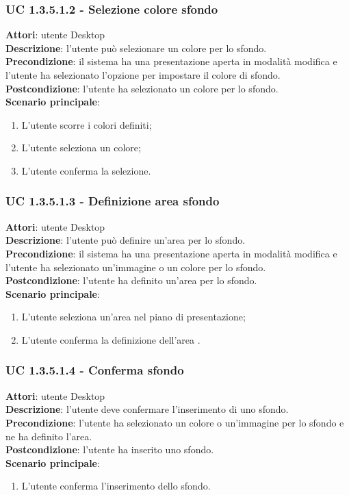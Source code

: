 \subsubsection{UC 1.3.5.1.2 - Selezione colore sfondo}{
	\label{uc1.3.5.1.2}
	\textbf{Attori}: utente Desktop \\
	\textbf{Descrizione}: l'utente può selezionare un colore per lo sfondo. \\
	\textbf{Precondizione}: il sistema ha una presentazione aperta in modalità modifica e l'utente ha selezionato l'opzione per impostare il colore di sfondo.	\\
	\textbf{Postcondizione}: l'utente ha selezionato un colore per lo sfondo.	\\
	\textbf{Scenario principale}:
	\begin{enumerate}
		\item L'utente scorre i colori definiti;
		\item L'utente seleziona un colore;
		\item L'utente conferma la selezione.
	\end{enumerate}
}
\subsubsection{UC 1.3.5.1.3 - Definizione area sfondo}{
	\label{uc1.3.5.1.3}
	\textbf{Attori}: utente Desktop \\
	\textbf{Descrizione}: l'utente può definire un'area per lo sfondo. \\
	\textbf{Precondizione}: il sistema ha una presentazione aperta in modalità modifica e l'utente ha selezionato un'immagine o un colore per lo sfondo.	\\
	\textbf{Postcondizione}: l'utente ha definito un'area per lo sfondo.	\\
	\textbf{Scenario principale}:
	\begin{enumerate}
		\item L'utente seleziona un'area nel piano di presentazione;
		\item L'utente conferma la definizione dell'area .
	\end{enumerate}
}
\subsubsection{UC 1.3.5.1.4 - Conferma sfondo}{
	\label{uc1.3.5.1.4}
	\textbf{Attori}: utente Desktop \\
	\textbf{Descrizione}: l'utente deve confermare l'inserimento di uno sfondo. \\
	\textbf{Precondizione}: l'utente ha selezionato un colore o un'immagine per lo sfondo e ne ha definito l'area.	\\
	\textbf{Postcondizione}: l'utente ha inserito uno sfondo.	\\
	\textbf{Scenario principale}:
	\begin{enumerate}
		\item L'utente conferma l'inserimento dello sfondo.
	\end{enumerate}
}
